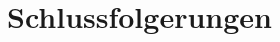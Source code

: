 \documentclass[./\jobname.tex]{subfiles}
\begin{document}
\chapter{Schlussfolgerungen}
\end{document}
